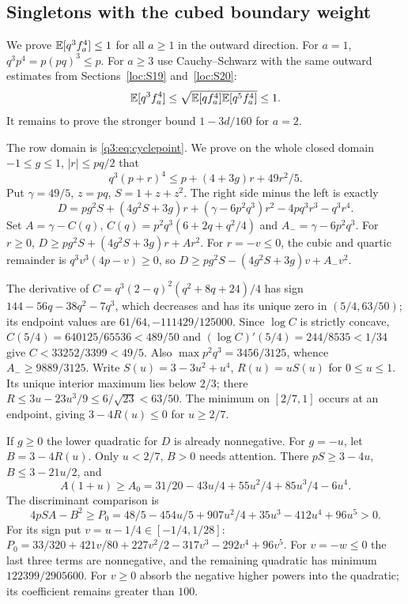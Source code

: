 \subsection{Singletons with the cubed boundary weight}\label{loc:S36}
We prove $\mathbb E[q^3f_a^4]\le1$ for all $a\ge1$ in the outward direction.
For $a=1$, $q^3p^4=p(pq)^3\le p$.
For $a\ge3$ use Cauchy--Schwarz with the same outward estimates from
Sections~\ref{loc:S19} and~\ref{loc:S20}:
\[
 \mathbb E[q^3f_a^4]\le\sqrt{\mathbb E[qf_a^4]\mathbb E[q^5f_a^4]}\le1.
\]
It remains to prove the stronger bound $1-3d/160$ for $a=2$.

The row domain is \eqref{q3:eq:cyclepoint}.
We prove on the whole closed domain $-1\le g\le1$, $|r|\le pq/2$ that
\begin{equation}\label{eq:compact-singleton-row}
 q^3(p+r)^4\le p+(4+3g)r+49r^2/5.
\end{equation}
Put $\gamma=49/5$, $z=pq$, $S=1+z+z^2$.
The right side minus the left is exactly
\[
 D=pg^2S+(4g^2S+3g)r+(\gamma-6p^2q^3)r^2-4pq^3r^3-q^3r^4.
\]
Set $A=\gamma-C(q)$, $C(q)=p^2q^3(6+2q+q^2/4)$ and
$A_-=\gamma-6p^2q^3$. For $r\ge0$,
$D\ge pg^2S+(4g^2S+3g)r+Ar^2$.
For $r=-v\le0$, the cubic and quartic remainder is
$q^3v^3(4p-v)\ge0$, so
$D\ge pg^2S-(4g^2S+3g)v+A_-v^2$.

The derivative of $C=q^3(2-q)^2(q^2+8q+24)/4$ has sign
$144-56q-38q^2-7q^3$, which decreases and has its unique zero in
$(5/4,63/50)$; its endpoint values are $61/64,-111429/125000$.
Since $\log C$ is strictly concave,
$C(5/4)=640125/65536<489/50$ and
$(\log C)'(5/4)=244/8535<1/34$ give
$C<33252/3399<49/5$.
Also $\max p^2q^3=3456/3125$, whence $A_-\ge9889/3125$.
Write $S(u)=3-3u^2+u^4$, $R(u)=uS(u)$ for $0\le u\le1$.
Its unique interior maximum lies below $2/3$; there
$R\le3u-23u^3/9\le6/\sqrt{23}<63/50$.
The minimum on $[2/7,1]$ occurs at an endpoint, giving
$3-4R(u)\le0$ for $u\ge2/7$.

If $g\ge0$ the lower quadratic for $D$ is already nonnegative.
For $g=-u$, let $B=3-4R(u)$. Only $u<2/7$, $B>0$ needs attention.
There $pS\ge3-4u$, $B\le3-21u/2$, and
\[
 A(1+u)\ge A_0=31/20-43u/4+55u^2/4+85u^3/4-6u^4.
\]
The discriminant comparison is
\[
 4pSA-B^2\ge P_0=48/5-454u/5+907u^2/4+35u^3-412u^4+96u^5>0.
\]
For its sign put $v=u-1/4\in[-1/4,1/28]$:
$P_0=33/320+421v/80+227v^2/2-317v^3-292v^4+96v^5$.
For $v=-w\le0$ the last three terms are nonnegative, and the remaining
quadratic has minimum $122399/2905600$.
For $v\ge0$ absorb the negative higher powers into the quadratic;
its coefficient remains greater than $100$.

